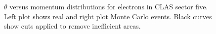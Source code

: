 \begin{figure}[htp]
\begin{center}
\caption{\small $\theta$ versus momentum distributions for electrons in CLAS sector five. Left plot shows real and right plot Monte Carlo events. Black curves show cuts applied to remove inefficient areas. \label{fig:other_cuts_negaitive_th_vs_p_electronss}}
\end{center}
\end{figure}






